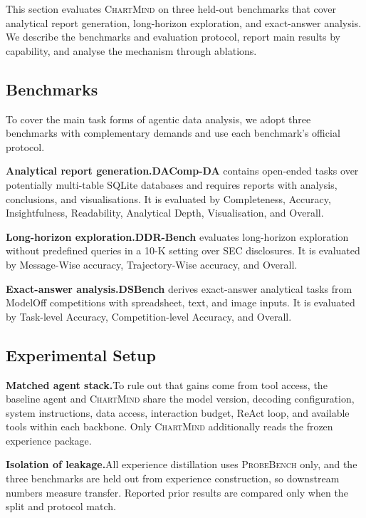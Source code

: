 \documentclass{article}
\newcommand{\method}{\textsc{ChartMind}\xspace}
\newcommand{\probe}{\textsc{ProbeBench}\xspace}
\newcommand{\stitle}[1]{\noindent\textbf{#1}}
\begin{document}
\noindent This section evaluates \method{} on three held-out benchmarks that cover analytical report generation, long-horizon exploration, and exact-answer analysis. We describe the benchmarks and evaluation protocol, report main results by capability, and analyse the mechanism through ablations.

\subsection{Benchmarks}
\label{sec:benchmarks}

\noindent To cover the main task forms of agentic data analysis, we adopt three benchmarks with complementary demands and use each benchmark's official protocol.

\stitle{Analytical report generation.}\quad \textbf{DAComp-DA} \citep{lei2025dacomp} contains open-ended tasks over potentially multi-table SQLite databases and requires reports with analysis, conclusions, and visualisations. It is evaluated by Completeness, Accuracy, Insightfulness, Readability, Analytical Depth, Visualisation, and Overall.

\stitle{Long-horizon exploration.}\quad \textbf{DDR-Bench} \citep{liu2026ddrbench} evaluates long-horizon exploration without predefined queries in a 10-K setting over SEC disclosures. It is evaluated by Message-Wise accuracy, Trajectory-Wise accuracy, and Overall.

\stitle{Exact-answer analysis.}\quad \textbf{DSBench} \citep{jing2024dsbench} derives exact-answer analytical tasks from ModelOff competitions with spreadsheet, text, and image inputs. It is evaluated by Task-level Accuracy, Competition-level Accuracy, and Overall.

\subsection{Experimental Setup}
\label{sec:main-exp-setup}

\stitle{Matched agent stack.}\quad To rule out that gains come from tool access, the baseline agent and \method{} share the model version, decoding configuration, system instructions, data access, interaction budget, ReAct loop, and available tools within each backbone. Only \method{} additionally reads the frozen experience package.

\stitle{Isolation of leakage.}\quad All experience distillation uses \probe{} only, and the three benchmarks are held out from experience construction, so downstream numbers measure transfer. Reported prior results are compared only when the split and protocol match.
\end{document}
